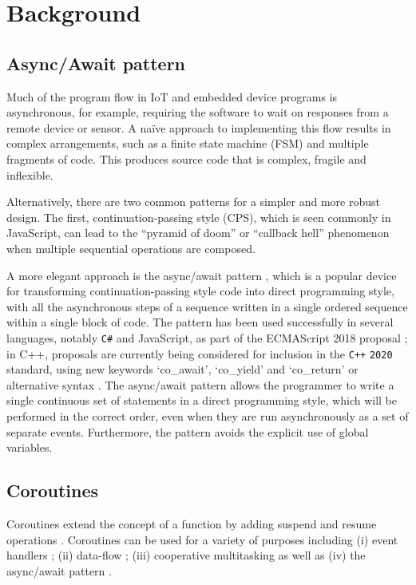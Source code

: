 \documentclass[format=acmsmall, review=false, screen=false]{acmart}
\begin{document}
\section{Background}
\label{section:background}

\subsection{Async/Await pattern}

Much of the program flow in IoT and embedded device programs is asynchronous, for example, requiring the software to wait on responses from a remote device or sensor. A naïve approach to implementing this flow results in complex arrangements, such as a finite state machine (FSM) and multiple fragments of code. This produces source code that is complex, fragile and inflexible.

Alternatively, there are two common patterns for a simpler and more robust design. The first, continuation-passing style (CPS), which is seen commonly in JavaScript, can lead to the “pyramid of doom” or “callback hell” phenomenon \cite{Brodu2015, Edwards2009, Madsen2017, Kambona2013} when multiple sequential operations are composed.

A more elegant approach is the async/await pattern \cite{Bierman2012, Haller2016, Okur2014, Syme2011}, which is a popular device for transforming continuation-passing style code into direct programming style, with all the asynchronous steps of a sequence written in a single ordered sequence within a single block of code. The pattern has been used successfully in several languages, notably \verb!C#! \cite{Bierman2012, Okur2014} and JavaScript, as part of the ECMAScript 2018 proposal \cite{ECMA2017}; in C++, proposals are currently being considered for inclusion in the \verb!C++! \verb!2020! standard, using new keywords ‘co\_await’, ‘co\_yield’ and ‘co\_return’ or alternative syntax \cite{ISO2017, Romer2018}. The async/await pattern allows the programmer to write a single continuous set of statements in a direct programming style, which will be performed in the correct order, even when they are run asynchronously as a set of separate events. Furthermore, the pattern avoids the explicit use of global variables.

\subsection{Coroutines}

Coroutines extend the concept of a function by adding suspend and resume operations \cite{Conway1963, Knuth1968, Marlin1979}. Coroutines can be used for a variety of purposes including (i) event handlers \cite{Dunkels2006}; (ii) data-flow \cite{Kugler2013}; (iii) cooperative multitasking \cite{Susilo2009} as well as (iv) the async/await pattern \cite{ISO2017}.
\end{document}
